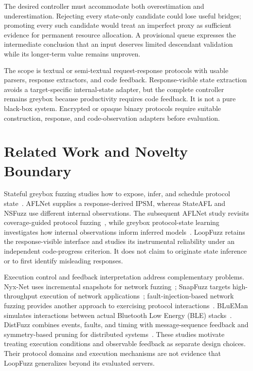 \documentclass[final,5p,times,number]{elsarticle}
\begin{document}
The desired controller must accommodate both overestimation and underestimation. Rejecting every state-only candidate could lose useful bridges; promoting every such candidate would treat an imperfect proxy as sufficient evidence for permanent resource allocation. A provisional queue expresses the intermediate conclusion that an input deserves limited descendant validation while its longer-term value remains unproven.

The scope is textual or semi-textual request-response protocols with usable parsers, response extractors, and code feedback. Response-visible state extraction avoids a target-specific internal-state adapter, but the complete controller remains greybox because productivity requires code feedback. It is not a pure black-box system. Encrypted or opaque binary protocols require suitable construction, response, and code-observation adapters before evaluation.

\section{Related Work and Novelty Boundary}
Stateful greybox fuzzing studies how to expose, infer, and schedule protocol state~\cite{aflnet,stateafl,nsfuzz,sgf_usenix22}. AFLNet supplies a response-derived IPSM, whereas StateAFL and NSFuzz use different internal observations. The subsequent AFLNet study revisits coverage-guided protocol fuzzing~\cite{aflnet5years2025}, while greybox protocol-state learning investigates how internal observations inform inferred models~\cite{stateinspector2022}. LoopFuzz retains the response-visible interface and studies its instrumental reliability under an independent code-progress criterion. It does not claim to originate state inference or to first identify misleading responses.

Execution control and feedback interpretation address complementary problems. Nyx-Net uses incremental snapshots for network fuzzing~\cite{nyxnet2022}; SnapFuzz targets high-throughput execution of network applications~\cite{snapfuzz2022}; fault-injection-based network fuzzing provides another approach to exercising protocol interactions~\cite{fuzztructionnet2024}. BLuEMan simulates interactions between actual Bluetooth Low Energy (BLE) stacks~\cite{blueman2025}. DistFuzz combines events, faults, and timing with message-sequence feedback and symmetry-based pruning for distributed systems~\cite{distfuzz2025}. These studies motivate treating execution conditions and observable feedback as separate design choices. Their protocol domains and execution mechanisms are not evidence that LoopFuzz generalizes beyond its evaluated servers.
\end{document}

